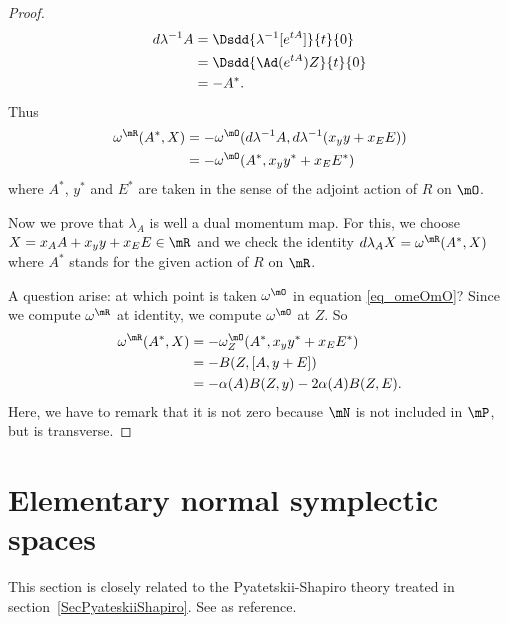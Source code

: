 \begin{proof}
	\[
		\begin{split}
			d\lambda^{-1}A&=\Dsdd{ \lambda^{-1}[ e^{tA}] }{t}{0}\\
			&=\Dsdd{ \Ad( e^{tA})Z }{t}{0}\\
			&=-A^*.
		\end{split}
	\]
	Thus
	\begin{equation} \label{eq_omeOmO}
		\begin{split}
			\omega^{\mR}(A^*,X)&=-\omega^{\mO}(d\lambda^{-1}A,d\lambda^{-1}(x_yy+x_EE))\\
			&=-\omega^{\mO}(A^*,x_yy^*+x_EE^*)
		\end{split}
	\end{equation}
	where $A^*$, $y^*$ and $E^*$ are taken in the sense of the adjoint action of $R$ on $\mO$.

	Now we prove that $\lambda_A$ is well a dual momentum map. For this, we choose $X=x_AA+x_yy+x_EE\in\mR$ and we check the identity $d\lambda_AX=\omega^{\mR}(A^*,X)$ where $A^*$ stands for the given action of $R$ on $\mR$.

	A question arise: at which point is taken $\omega^{\mO}$ in equation \eqref{eq_omeOmO}? Since we compute $\omega^{\mR}$ at identity, we compute $\omega^{\mO}$ at $Z$. So
	\[
		\begin{split}
			\omega^{\mR}(A^*,X)&=-\omega^{\mO}_Z(A^*,x_yy^*+x_EE^*)\\
			&=-B(Z,[A,y+E])\\
			&=-\alpha(A)B(Z,y)-2\alpha(A)B(Z,E).
		\end{split}
	\]
	Here, we have to remark that it is not zero because $\mN$ is not included in $\mP$, but is transverse.

\end{proof}
\section{Elementary normal symplectic spaces}
\label{SecElemNormSymplSpace}

This section is closely related to the Pyatetskii-Shapiro theory treated in section~\ref{SecPyateskiiShapiro}. See \cite{QuantifKhalerian} as reference.

